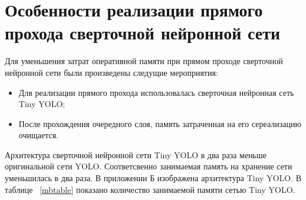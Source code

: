 \documentclass[a4paper,english,russian]{G2-105}
\begin{document}
\section{Особенности реализации прямого прохода сверточной нейронной сети}
\par Для уменьшения затрат оперативной памяти при прямом проходе сверточной нейронной сети были произведены следущие мероприятия:
\begin{itemize}
\item Для реализации прямого прохода использовалась сверточная нейронная сеть Tiny YOLO;
\item После прохождения очередного слоя, память затраченная на его сереализацию очищается.
\end{itemize}
\par Архитектура сверточной нейронной сети Tiny YOLO в два раза меньше оригинальной сети YOLO. Соответсвенно занимаемая память на хранение сети уменьшилась в два раза. В приложении Б изображена архитектура Tiny YOLO. В таблице ~\ref{mbtable} показано количество занимаемой памяти сетью Tiny YOLO.
\end{document}
